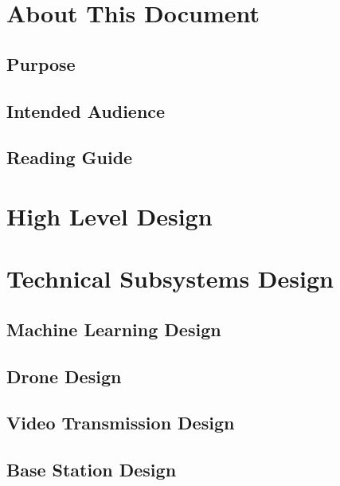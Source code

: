 \documentclass[10pt,letterpaper]{article}
\begin{document}
\section{About This Document}

\subsection{Purpose}

\subsection{Intended Audience}

\subsection{Reading Guide}

\section{High Level Design}

\section{Technical Subsystems Design}
\subsection{Machine Learning Design}
\subsection{Drone Design}
\subsection{Video Transmission Design}
\subsection{Base Station Design}
\clearpage
{}



\end{document}
